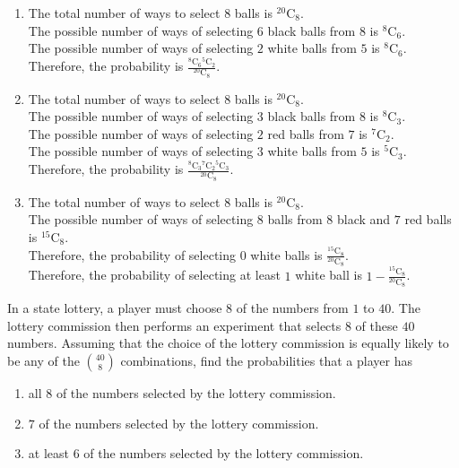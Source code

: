 \documentclass[fleqn, a4paper, 11pt, oneside]{amsart}
\theoremstyle{definition}
\theoremstyle{theorem}
\newcommand*{\comb}[2]{{}^{#1}\mathrm{C}_{#2}}%
\begin{document}
\begin{solution}
	\begin{enumerate}[leftmargin=*]
		\item
			The total number of ways to select $8$ balls is $\comb{20}{8}$.\\
			The possible number of ways of selecting $6$ black balls from $8$ is $\comb{8}{6}$.\\
			The possible number of ways of selecting $2$ white balls from $5$ is $\comb{8}{6}$.\\
			Therefore, the probability is $\frac{\comb{8}{6} \comb{5}{2}}{\comb{20}{8}}$.
		\item
			The total number of ways to select $8$ balls is $\comb{20}{8}$.\\
			The possible number of ways of selecting $3$ black balls from $8$ is $\comb{8}{3}$.\\
			The possible number of ways of selecting $2$ red balls from $7$ is $\comb{7}{2}$.\\
			The possible number of ways of selecting $3$ white balls from $5$ is $\comb{5}{3}$.\\
			Therefore, the probability is $\frac{\comb{8}{3} \comb{7}{2} \comb{5}{3}}{\comb{20}{8}}$.
		\item
			The total number of ways to select $8$ balls is $\comb{20}{8}$.\\
			The possible number of ways of selecting $8$ balls from $8$ black and $7$ red balls is $\comb{15}{8}$.\\
			Therefore, the probability of selecting $0$ white balls is $\frac{\comb{15}{8}}{\comb{20}{8}}$.\\
			Therefore, the probability of selecting at least $1$ white ball is $1 - \frac{\comb{15}{8}}{\comb{20}{8}}$.
	\end{enumerate}
\end{solution}

\begin{question}
	In a state lottery, a player must choose $8$ of the numbers from $1$ to $40$.
	The lottery commission then performs an experiment that selects $8$ of these $40$ numbers.
	Assuming that the choice of the lottery commission is equally likely to be any of the $\binom{40}{8}$ combinations, find the probabilities that a player has
	\begin{enumerate}
		\item all $8$ of the numbers selected by the lottery commission.
		\item $7$ of the numbers selected by the lottery commission.
		\item at least $6$ of the numbers selected by the lottery commission.
	\end{enumerate}
\end{question}
\end{document}
